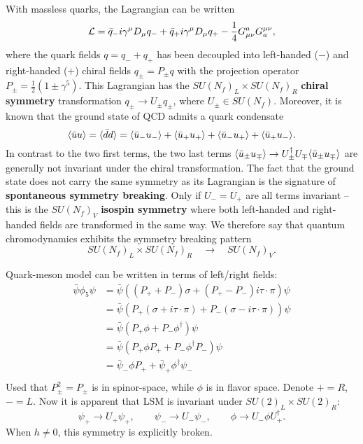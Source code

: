 With massless quarks, the Lagrangian can be written
\begin{equation}
	\mathcal{L} = \bar{q}_- i \gamma^\mu D_\mu q_- + \bar{q}_+ i \gamma^\mu D_\mu q_+ - \frac14 G_{\mu\nu}^a G^{\mu\nu}_a,
\end{equation}
where the quark fields $q = q_- + q_+$ has been decoupled into left-handed ($-$) and right-handed ($+$) chiral fields $q_\pm = P_\pm q$ with the projection operator $P_\pm = \frac12 (1 \pm \gamma^5)$.
This Lagrangian has the $SU(N_f)_L \times SU(N_f)_R$ \textbf{chiral symmetry} transformation $q_\pm \rightarrow U_\pm q_\pm$, where $U_\pm \in SU(N_f)$.
Moreover, it is known that the ground state of QCD admits a quark condensate
\begin{equation}
	\langle \bar{u} u \rangle = \langle \bar{d} d \rangle = \langle \bar{u}_- u_- \rangle + \langle \bar{u}_+ u_+ \rangle + \langle \bar{u}_- u_+ \rangle + \langle \bar{u}_+ u_- \rangle.
\end{equation}
In contrast to the two first terms, the two last terms $\langle \bar{u}_\pm u_\mp \rangle \rightarrow U_\pm^\dagger U_\mp \langle \bar{u}_\pm u_\mp \rangle$ are generally not invariant under the chiral transformation.
The fact that the ground state does not carry the same symmetry as its Lagrangian is the signature of \textbf{spontaneous symmetry breaking}.
Only if $U_- = U_+$ are all terms invariant -- this is the $SU(N_f)_V$ \textbf{isospin symmetry} where both left-handed and right-handed fields are transformed in the same way.
We therefore say that quantum chromodynamics exhibits the symmetry breaking pattern
\begin{equation}
	SU(N_f)_L \times SU(N_f)_R \quad \rightarrow \quad SU(N_f)_V .
\end{equation}

Quark-meson model can be written in terms of left/right fields:
\begin{equation}
\begin{split}
	\bar{\psi} \phi_5 \psi &= \bar{\psi} ( (P_+ + P_-) \sigma + (P_+ - P_-) i \tau \cdot \pi) \psi \\
	                       &= \bar{\psi} ( P_+ (\sigma + i \tau \cdot \pi) + P_- (\sigma - i \tau \cdot \pi) ) \psi \\
	                       &= \bar{\psi} ( P_+ \phi + P_- \phi^\dagger) \psi \\
	                       &= \bar{\psi} ( P_+ \phi P_+ + P_- \phi^\dagger P_-) \psi \\
	                       &= \bar{\psi}_- \phi P_+ + \bar{\psi}_+ \phi^\dagger \psi_- \\
\end{split}
\end{equation}
Used that $P_\pm^2 = P_\pm$ is in spinor-space, while $\phi$ is in flavor space.
Denote $+ = R$, $- = L$.
Now it is apparent that LSM is invariant under $SU(2)_L \times SU(2)_R$:
\begin{equation}
	\psi_+ \rightarrow U_+ \psi_+, \qquad
	\psi_- \rightarrow U_- \psi_-, \qquad
	\phi   \rightarrow U_- \phi U_+^\dagger.
\end{equation}
When $h \neq 0$, this symmetry is explicitly broken.


